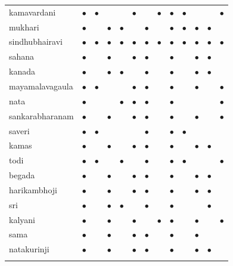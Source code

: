 \begin{table}
\begin{tabular}{ l : L{0.35cm} : L{0.35cm} : L{0.35cm} : L{0.45cm} : L{0.35cm} : L{0.35cm} : L{0.35cm} : L{0.35cm} : L{0.35cm} : L{0.5cm} : L{0.45cm} : L{0.35cm}: }
			\gls{kamavardani} & $\bullet$ & $\bullet$ &  &  & $\bullet$ &  & $\bullet$ & $\bullet$ & $\bullet$ &  &  & $\bullet$\tabularnewline
			\gls{mukhari} & $\bullet$ &  & $\bullet$ & $\bullet$ &  & $\bullet$ &  & $\bullet$ & $\bullet$ & $\bullet$ & $\bullet$ & \tabularnewline
			\gls{sindhubhairavi} & $\bullet$ & $\bullet$ & $\bullet$ & $\bullet$ & $\bullet$ & $\bullet$ & $\bullet$ & $\bullet$ & $\bullet$ & $\bullet$ & $\bullet$ & $\bullet$\tabularnewline
			\gls{sahana} & $\bullet$ &  & $\bullet$ &  & $\bullet$ & $\bullet$ &  & $\bullet$ &  & $\bullet$ & $\bullet$ & \tabularnewline
			\gls{kanada} & $\bullet$ &  & $\bullet$ & $\bullet$ &  & $\bullet$ &  & $\bullet$ &  & $\bullet$ & $\bullet$ & \tabularnewline
			\gls{mayamalavagaula} & $\bullet$ & $\bullet$ &  &  & $\bullet$ & $\bullet$ &  & $\bullet$ &  & $\bullet$ &  & $\bullet$\tabularnewline
			\gls{nata} & $\bullet$ &  &  & $\bullet$ & $\bullet$ & $\bullet$ &  & $\bullet$ &  &  &  & $\bullet$\tabularnewline
			\gls{sankarabharanam} & $\bullet$ &  & $\bullet$ &  & $\bullet$ & $\bullet$ &  & $\bullet$ &  & $\bullet$ &  & $\bullet$\tabularnewline
			\gls{saveri} & $\bullet$ & $\bullet$ &  &  &  & $\bullet$ &  & $\bullet$ & $\bullet$ &  &  & \tabularnewline
			\gls{kamas} & $\bullet$ &  & $\bullet$ &  & $\bullet$ & $\bullet$ &  & $\bullet$ &  & $\bullet$ & $\bullet$ & \tabularnewline
			\gls{todi} & $\bullet$ & $\bullet$ &  & $\bullet$ &  & $\bullet$ &  & $\bullet$ & $\bullet$ &  &  & $\bullet$\tabularnewline
			\gls{begada} & $\bullet$ &  & $\bullet$ &  & $\bullet$ & $\bullet$ &  & $\bullet$ &  & $\bullet$ & $\bullet$ & \tabularnewline
			\gls{harikambhoji} & $\bullet$ &  & $\bullet$ &  & $\bullet$ & $\bullet$ &  & $\bullet$ &  & $\bullet$ & $\bullet$ & \tabularnewline
			\gls{sri} & $\bullet$ &  & $\bullet$ & $\bullet$ &  & $\bullet$ &  & $\bullet$ &  &  & $\bullet$ & \tabularnewline
			\gls{kalyani} & $\bullet$ &  & $\bullet$ &  & $\bullet$ &  & $\bullet$ & $\bullet$ &  & $\bullet$ &  & $\bullet$\tabularnewline
			\gls{sama} & $\bullet$ &  & $\bullet$ &  & $\bullet$ & $\bullet$ &  & $\bullet$ &  & $\bullet$ &  & \tabularnewline
			\gls{natakurinji} & $\bullet$ &  & $\bullet$ &  & $\bullet$ & $\bullet$ &  & $\bullet$ &  & $\bullet$ & $\bullet$ & \tabularnewline

\end{tabular}
\end{table}

